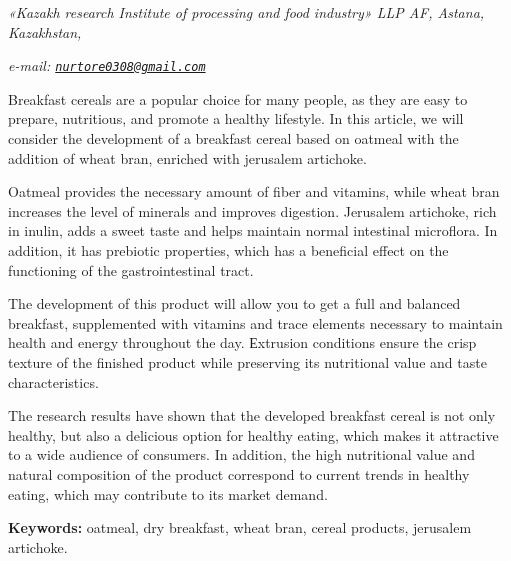 \begin{affiliation}
\emph{«Kazakh research Institute of processing and food industry» LLP AF, Astana, Kazakhstan,}

\emph{e-mail: \href{mailto:nurtore0308@gmail.com}{\nolinkurl{nurtore0308@gmail.com}}}
\end{affiliation}

Breakfast cereals are a popular choice for many people, as they are easy
to prepare, nutritious, and promote a healthy lifestyle. In this
article, we will consider the development of a breakfast cereal based on
oatmeal with the addition of wheat bran, enriched with jerusalem
artichoke.

Oatmeal provides the necessary amount of fiber and vitamins, while wheat
bran increases the level of minerals and improves digestion. Jerusalem
artichoke, rich in inulin, adds a sweet taste and helps maintain normal
intestinal microflora. In addition, it has prebiotic properties, which
has a beneficial effect on the functioning of the gastrointestinal
tract.

The development of this product will allow you to get a full and
balanced breakfast, supplemented with vitamins and trace elements
necessary to maintain health and energy throughout the day. Еxtrusion
conditions ensure the crisp texture of the finished product while
preserving its nutritional value and taste characteristics.

The research results have shown that the developed breakfast cereal is
not only healthy, but also a delicious option for healthy eating, which
makes it attractive to a wide audience of consumers. In addition, the
high nutritional value and natural composition of the product correspond
to current trends in healthy eating, which may contribute to its market
demand.

{\bfseries Keywords:} oatmeal, dry breakfast, wheat bran, cereal products,
jerusalem artichoke.

